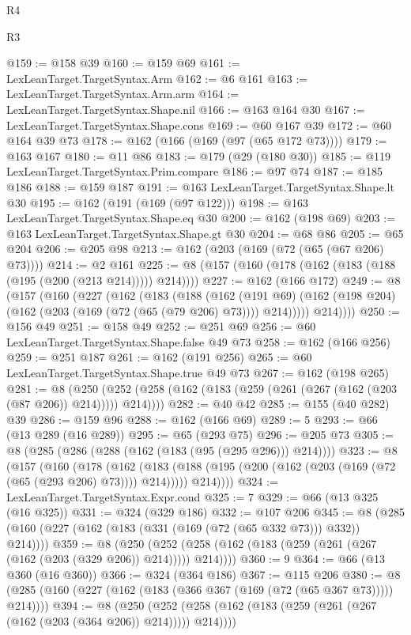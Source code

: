 \begin{lexlean}{R4}
\begin{lexlean}{R3}
\begin{coremodule}
{{{{{{{{{{{{{{{{@159 := @158 @39
@160 := @159 @69
@161 := LexLeanTarget.TargetSyntax.Arm
@162 := @6 @161
@163 := LexLeanTarget.TargetSyntax.Arm.arm
@164 := LexLeanTarget.TargetSyntax.Shape.nil
@166 := @163 @164 @30
@167 := LexLeanTarget.TargetSyntax.Shape.cons
@169 := @60 @167 @39
@172 := @60 @164 @39 @73
@178 := @162 (@166 (@169 (@97 (@65 @172 @73))))
@179 := @163 @167
@180 := @11 @86
@183 := @179 (@29 (@180 @30))
@185 := @119 LexLeanTarget.TargetSyntax.Prim.compare
@186 := @97 @74
@187 := @185 @186
@188 := @159 @187
@191 := @163 LexLeanTarget.TargetSyntax.Shape.lt @30
@195 := @162 (@191 (@169 (@97 @122)))
@198 := @163 LexLeanTarget.TargetSyntax.Shape.eq @30
@200 := @162 (@198 @69)
@203 := @163 LexLeanTarget.TargetSyntax.Shape.gt @30
@204 := @68 @86
@205 := @65 @204
@206 := @205 @98
@213 := @162 (@203 (@169 (@72 (@65 (@67 @206) @73))))
@214 := @2 @161
@225 := @8 (@157 (@160 (@178 (@162 (@183 (@188 (@195 (@200 (@213 @214))))) @214))))
@227 := @162 (@166 @172)
@249 := @8
    (@157
      (@160
        (@227
          (@162
            (@183
              (@188
                (@162
                  (@191 @69)
                  (@162 (@198 @204) (@162 (@203 (@169 (@72 (@65 (@79 @206) @73)))) @214)))))
            @214))))
@250 := @156 @49
@251 := @158 @49
@252 := @251 @69
@256 := @60 LexLeanTarget.TargetSyntax.Shape.false @49 @73
@258 := @162 (@166 @256)
@259 := @251 @187
@261 := @162 (@191 @256)
@265 := @60 LexLeanTarget.TargetSyntax.Shape.true @49 @73
@267 := @162 (@198 @265)
@281 := @8
    (@250 (@252 (@258 (@162 (@183 (@259 (@261 (@267 (@162 (@203 (@87 @206)) @214))))) @214))))
@282 := @40 @42
@285 := @155 (@40 @282) @39
@286 := @159 @96
@288 := @162 (@166 @69)
@289 := 5
@293 := @66 (@13 @289 (@16 @289))
@295 := @65 (@293 @75)
@296 := @205 @73
@305 := @8 (@285 (@286 (@288 (@162 (@183 (@95 (@295 @296))) @214))))
@323 := @8
    (@157
      (@160
        (@178
          (@162
            (@183 (@188 (@195 (@200 (@162 (@203 (@169 (@72 (@65 (@293 @206) @73)))) @214)))))
            @214))))
@324 := LexLeanTarget.TargetSyntax.Expr.cond
@325 := 7
@329 := @66 (@13 @325 (@16 @325))
@331 := @324 (@329 @186)
@332 := @107 @206
@345 := @8 (@285 (@160 (@227 (@162 (@183 (@331 (@169 (@72 (@65 @332 @73))) @332)) @214))))
@359 := @8
    (@250 (@252 (@258 (@162 (@183 (@259 (@261 (@267 (@162 (@203 (@329 @206)) @214))))) @214))))
@360 := 9
@364 := @66 (@13 @360 (@16 @360))
@366 := @324 (@364 @186)
@367 := @115 @206
@380 := @8 (@285 (@160 (@227 (@162 (@183 (@366 @367 (@169 (@72 (@65 @367 @73))))) @214))))
@394 := @8
    (@250 (@252 (@258 (@162 (@183 (@259 (@261 (@267 (@162 (@203 (@364 @206)) @214))))) @214))))
}}}}}}}}}}}}}}}}
\end{coremodule}
\end{lexlean}
\end{lexlean}
